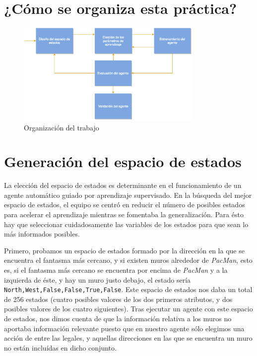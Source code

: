 \documentclass[12pt]{article}
\begin{document}
\newpage

\section{¿Cómo se organiza esta práctica?}

\begin{figure}[h]
    \centering
    \includegraphics[width=0.8\textwidth]{diagram}
    \caption{Organización del trabajo}
\end{figure}

\section{Generación del espacio de estados}


La elección del espacio de estados es determinante en el funcionamiento de un agente automático guiado por aprendizaje supervisado. En la búsqueda del mejor espacio de estados, el equipo se centró en reducir el número de posibles estados para acelerar el aprendizaje mientras se fomentaba la generalización. Para ésto hay que seleccionar cuidadosamente las variables de los estados para que sean lo más informados posibles.

Primero, probamos un espacio de estados formado por la dirección en la que se encuentra el fantasma más cercano, y si existen muros alrededor de \textit{PacMan}, esto es, si el fantasma más cercano se encuentra por encima de \textit{PacMan} y a la izquierda de éste, y hay un muro justo debajo, el estado sería \texttt{North,West,False,False,True,False}. Este espacio de estados nos daba un total de 256 estados (cuatro posibles valores de los dos primeros atributos, y dos posibles valores de los cuatro siguientes). Tras ejecutar un agente con este espacio de estados, nos dimos cuenta de que la información relativa a los muros no aportaba información relevante puesto que en nuestro agente sólo elegimos una acción de entre las legales, y aquellas direcciones en las que se encuentra un muro no están incluídas en dicho conjunto.
\end{document}
